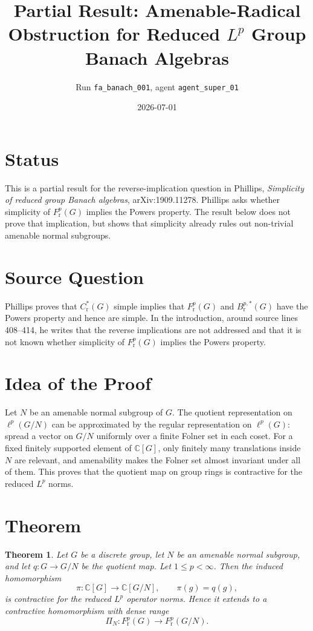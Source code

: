 \documentclass[11pt]{article}
\title{Partial Result: Amenable-Radical Obstruction for Reduced \texorpdfstring{$L^p$}{Lp} Group Banach Algebras}
\author{Run \texttt{fa\_banach\_001}, agent \texttt{agent\_super\_01}}
\date{2026-07-01}
\newtheorem{theorem}{Theorem}
\newcommand{\C}{\mathbb C}
\begin{document}
\maketitle

\section*{Status}

This is a partial result for the reverse-implication question in Phillips,
\emph{Simplicity of reduced group Banach algebras}, arXiv:1909.11278. Phillips
asks whether simplicity of $F^p_{\mathrm r}(G)$ implies the Powers property.
The result below does not prove that implication, but shows that simplicity
already rules out non-trivial amenable normal subgroups.

\section*{Source Question}

Phillips proves that $C^*_{\mathrm r}(G)$ simple implies that
$F^p_{\mathrm r}(G)$ and $B^{p,*}_{\mathrm r}(G)$ have the Powers property and
hence are simple. In the introduction, around source lines 408--414, he writes
that the reverse implications are not addressed and that it is not known
whether simplicity of $F^p_{\mathrm r}(G)$ implies the Powers property.

\section*{Idea of the Proof}

Let $N$ be an amenable normal subgroup of $G$. The quotient representation on
$\ell^p(G/N)$ can be approximated by the regular representation on
$\ell^p(G)$: spread a vector on $G/N$ uniformly over a finite Folner set in
each coset. For a fixed finitely supported element of $\C[G]$, only finitely
many translations inside $N$ are relevant, and amenability makes the Folner
set almost invariant under all of them. This proves that the quotient map on
group rings is contractive for the reduced $L^p$ norms.

\section*{Theorem}

\begin{theorem}\label{thm:quotient}
Let $G$ be a discrete group, let $N$ be an amenable normal subgroup, and let
$q:G\to G/N$ be the quotient map. Let $1\leq p<\infty$. Then the induced
homomorphism
\[
  \pi:\C[G]\to \C[G/N], \qquad \pi(g)=q(g),
\]
is contractive for the reduced $L^p$ operator norms. Hence it extends to a
contractive homomorphism with dense range
\[
  \Pi_N:F^p_{\mathrm r}(G)\longrightarrow F^p_{\mathrm r}(G/N).
\]
\end{theorem}
\end{document}

